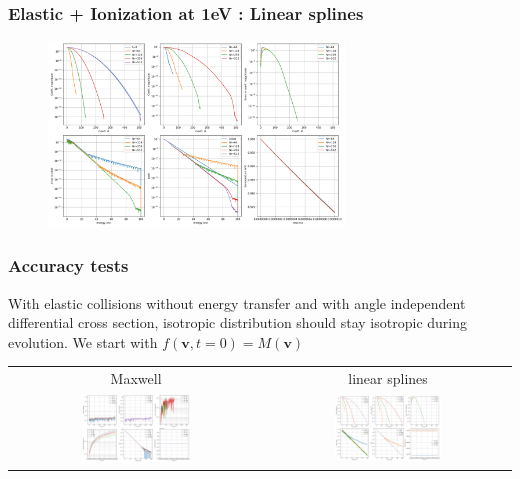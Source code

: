 \documentclass[mathserif, aspectratio=169]{beamer}
\newcommand{\vect}[1]{\boldsymbol{#1}}
\begin{document}
\begin{frame}
	\frametitle{Elastic + Ionization at 1eV : Linear splines}
	\begin{figure}
		\centering
		\includegraphics[width=0.7\textwidth]{figures/b_1ev_coeff.png}
	\end{figure}
\end{frame}


\begin{frame}
	\frametitle{Accuracy tests}
	With elastic collisions without energy transfer and with angle independent differential cross section, isotropic distribution should stay isotropic during evolution. We start with $f(\vect{v},t=0) = M(\vect{v})$
	
	\begin{table}
		\centering
		\begin{tabular}{cc}
			Maxwell &   linear splines\\
			\includegraphics[width=0.45\textwidth]{figures/m_1ev_no_cooling_coeff.png} & 
			\includegraphics[width=0.45\textwidth]{figures/b_1ev_no_cooling_coeff.png} 
		\end{tabular}
	\end{table}
\end{frame}
\end{document}
